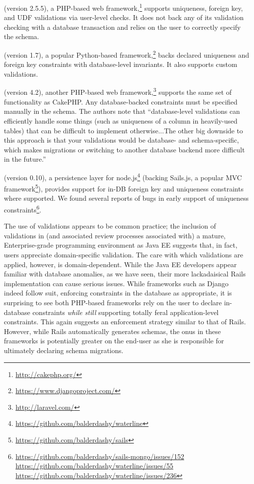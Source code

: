  (version 2.5.5), a PHP-based web
framework,\footnote{\url{http://cakephp.org/}} supports uniqueness,
foreign key, and UDF validations via user-level checks. It does not
back any of its validation checking with a database transaction and
relies on the user to correctly specify the schema.

 (version 1.7), a popular Python-based
framework,\footnote{\url{https://www.djangoproject.com/}} backs declared
uniqueness and foreign key constraints with database-level
invariants. It also supports custom validations.

 (version 4.2), another PHP-based web framework,\footnote{\url{http://laravel.com/}} supports the same
set of functionality as CakePHP. Any database-backed constraints must
be specified manually in the schema. The authors note that
``database-level validations can efficiently handle some things (such
as uniqueness of a column in heavily-used tables) that can be
difficult to implement otherwise...The other big downside to this
approach is that your validations would be database- and
schema-specific, which makes migrations or switching to another
database backend more difficult in the future.''

 (version 0.10), a persistence layer for
node.js\footnote{\url{https://github.com/balderdashy/waterline}} (backing
Sails.js, a popular MVC
framework\footnote{\url{https://github.com/balderdashy/sails}}),
provides support for in-DB foreign key and uniqueness constraints
where supported. We found several reports of bugs in early support of
uniqueness
constraints\footnote{\url{https://github.com/balderdashy/sails-mongo/issues/152}
  \url{https://github.com/balderdashy/waterline/issues/55}
  \url{https://github.com/balderdashy/waterline/issues/236}}.

 The use of validations appears to be common
practice; the inclusion of validations in (and associated review
processes associated with) a mature, Enterprise-grade programming
environment as Java EE suggests that, in fact, users appreciate
domain-specific validation. The care with which validations are
applied, however, is domain-dependent. While the Java EE developers
appear familiar with database anomalies, as we have seen, their more
lackadaisical Rails implementation can cause serious issues. While
frameworks such as Django indeed follow suit, enforcing constraints in
the database as appropriate, it is surprising to see both PHP-based
frameworks rely on the user to declare in-database constraints
\textit{while still} supporting totally feral application-level
constraints. This again suggests an enforcement strategy similar to
that of Rails. However, while Rails automatically generates schemas,
the onus in these frameworks is potentially greater on the end-user as
she is responsible for ultimately declaring schema migrations.


